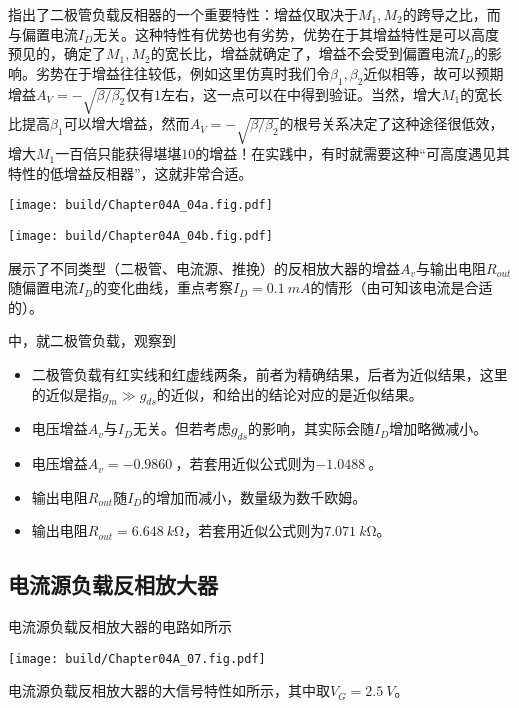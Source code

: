 指出了二极管负载反相器的一个重要特性：增益仅取决于$M_1,M_2$的跨导之比，而与偏置电流$I_D$无关。这种特性有优势也有劣势，优势在于其增益特性是可以高度预见的，确定了$M_1,M_2$的宽长比，增益就确定了，增益不会受到偏置电流$I_D$的影响。劣势在于增益往往较低，例如这里仿真时我们令$\beta_1,\beta_2$近似相等，故可以预期增益$A_V=-\sqrt{\beta/\beta_2}$仅有$1$左右，这一点可以在中得到验证。当然，增大$M_1$的宽长比提高$\beta_1$可以增大增益，然而$A_V=-\sqrt{\beta/\beta_2}$的根号关系决定了这种途径很低效，增大$M_1$一百倍只能获得堪堪$10$的增益！在实践中，有时就需要这种“可高度遇见其特性的低增益反相器”，这就非常合适。

\begin{Figure}[反相放大器的特性与偏置的关系]
    \begin{FigureSub}
        \texttt{[image: build/Chapter04A\_04a.fig.pdf]}
    \end{FigureSub}
    \begin{FigureSub}
        \texttt{[image: build/Chapter04A\_04b.fig.pdf]}
    \end{FigureSub}
\end{Figure}

展示了不同类型（二极管、电流源、推挽）的反相放大器的增益$A_v$与输出电阻$R_{out}$随偏置电流$I_D$的变化曲线，重点考察$I_D=\SI{0.1}{mA}$的情形（由可知该电流是合适的）。

中，就二极管负载，观察到
\begin{itemize}
    \item 二极管负载有红实线和红虚线两条，前者为精确结果，后者为近似结果，这里的近似是指$g_{m}\gg g_{ds}$的近似，和给出的结论对应的是近似结果。
    \item 电压增益$A_v$与$I_D$无关。但若考虑$g_{ds}$的影响，其实际会随$I_D$增加略微减小。
    \item 电压增益$A_v=\SI{-0.9860}{}$，若套用近似公式则为$\SI{-1.0488}{}$。
    \item 输出电阻$R_{out}$随$I_D$的增加而减小，数量级为数千欧姆。
    \item 输出电阻$R_{out}=\SI{6.648}{k\ohm}$，若套用近似公式则为$\SI{7.071}{k\ohm}$。
\end{itemize}

\subsection{电流源负载反相放大器}
电流源负载反相放大器的电路如所示
\begin{Figure}[电流源负载反相放大器]
    \texttt{[image: build/Chapter04A\_07.fig.pdf]}
\end{Figure}
电流源负载反相放大器的大信号特性如所示，其中取$V_G=\SI{2.5}{V}$。

